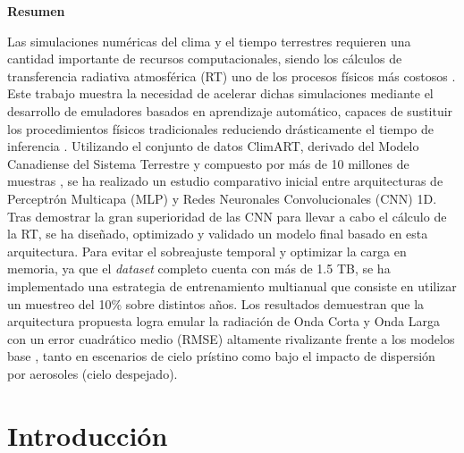\documentclass[11pt,a4paper,twoside,pdf]{article}
\numberwithin{equation}{section}
\begin{document}
\begin{center}
    

{\bf Resumen}
\bigskip

\begin{minipage}{0.8\linewidth}
Las simulaciones numéricas del clima y el tiempo terrestres requieren una cantidad importante de recursos computacionales, siendo los cálculos de transferencia radiativa atmosférica (RT) uno de los procesos físicos más costosos \cite{ClimART2021}. Este trabajo muestra la necesidad de acelerar dichas simulaciones mediante el desarrollo de emuladores basados en aprendizaje automático, capaces de sustituir los procedimientos físicos tradicionales reduciendo drásticamente el tiempo de inferencia \cite{ClimSim2023}. Utilizando el conjunto de datos ClimART, derivado del Modelo Canadiense del Sistema Terrestre y compuesto por más de 10 millones de muestras \cite{ClimART2021}, se ha realizado un estudio comparativo inicial entre arquitecturas de Perceptrón Multicapa (MLP) y Redes Neuronales Convolucionales (CNN) 1D. Tras demostrar la gran superioridad de las CNN para llevar a cabo el cálculo de la RT, se ha diseñado, optimizado y validado un modelo final basado en esta arquitectura. Para evitar el sobreajuste temporal y optimizar la carga en memoria, ya que el \textit{dataset} completo cuenta con más de 1.5 TB, se ha implementado una estrategia de entrenamiento multianual que consiste en utilizar  un muestreo del 10\% sobre distintos años. Los resultados demuestran que la arquitectura propuesta logra emular la radiación de Onda Corta y Onda Larga con un error cuadrático medio (RMSE) altamente rivalizante frente a los modelos base \cite{Aryandoust2023}, tanto en escenarios de cielo prístino como bajo el impacto de dispersión por aerosoles (cielo despejado).
\end{minipage}
\end{center}
\vfill
\newpage



\tableofcontents

\newpage
\pagestyle{fancy}
\fancyhead[RO,LE]{\leftmark}
\fancyhead[LO,RE]{\thepage}
\fancyfoot{}

\section{Introducción}
\end{document}
